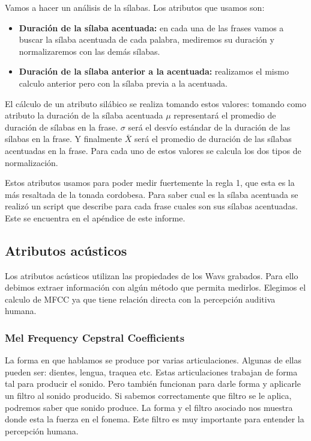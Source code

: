 Vamos a hacer un análisis de la sílabas. Los atributos que usamos son:

\begin{itemize}
    \item \textbf{Duración de la sílaba acentuada:} en cada una de las frases vamos a buscar la sílaba acentuada de cada palabra, mediremos su duración y normalizaremos con las demás sílabas.
    \item \textbf{Duración de la sílaba anterior a la acentuada:} realizamos el mismo calculo anterior pero con la sílaba previa a la acentuada. 
\end{itemize}

El cálculo de un atributo silábico se realiza tomando estos valores: tomando como atributo la duración de la sílaba acentuada $\mu$ representará el promedio de duración de sílabas en la frase. $\sigma$ será el desvío estándar de la duración de las sílabas en la frase. Y finalmente $\bar{X}$ será el promedio de duración de las sílabas acentuadas en la frase. Para cada uno de estos valores se calcula los dos tipos de normalización.

Estos atributos usamos para poder medir fuertemente la regla 1, que esta es la más resaltada de la tonada cordobesa. Para saber cual es la sílaba acentuada se realizó un script que describe para cada frase cuales son sus sílabas acentuadas. Este se encuentra en el apéndice de este informe.

\subsection{Atributos acústicos}

Los atributos acústicos utilizan las propiedades de los Wavs grabados. Para ello debimos extraer información con algún método que permita medirlos. Elegimos el calculo de MFCC ya que tiene relación directa con la percepción auditiva humana. 

\subsubsection{Mel Frequency Cepstral Coefficients}


La forma en que hablamos se produce por varias articulaciones. Algunas de ellas pueden ser: dientes, lengua, traquea etc. Estas articulaciones trabajan de forma tal para producir el sonido. Pero también funcionan para darle forma y aplicarle un filtro al sonido producido. Si sabemos correctamente que filtro se le aplica, podremos saber que sonido produce. La forma y el filtro asociado nos muestra donde esta la fuerza en el fonema. Este filtro es muy importante para entender la percepción humana.

